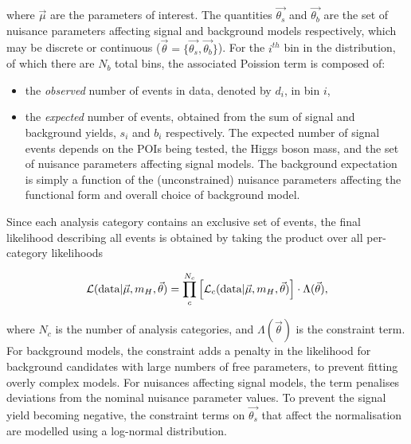 \noindent where $\vec{\mu}$ are the parameters of interest. The quantities $\vec{\theta_{s}}$ and $\vec{\theta_{b}}$ are the set of nuisance parameters affecting signal and background models respectively, which may be discrete or continuous ($\vec{\theta}=\{\vec{\theta_{s}},\vec{\theta_{b}}\}$). For the $i^{th}$ bin in the \mee distribution, of which there are $N_{b}$ total bins, the associated Poission term is composed of:

\begin{itemize}
    \item the \textit{observed} number of events in data, denoted by $d_{i}$, in bin $i$,
    \item the \textit{expected} number of events, obtained from the sum of signal and background yields, $s_{i}$ and $b_{i}$ respectively. The expected number of signal events depends on the POIs being tested, the Higgs boson mass, and the set of nuisance parameters affecting signal models. The background expectation is simply a function of the (unconstrained) nuisance parameters affecting the functional form and overall choice of background model. %
\end{itemize}



\noindent Since each analysis category contains an exclusive set of events, the final likelihood describing all events is obtained by taking the product over all per-category likelihoods

\begin{equation}
    \mathcal{L}(\mathrm{data}|\vec{\mu},m_{H},\vec{\theta}) = \prod_{c}^{N_{c}} \left[\mathcal{L}_{c}(\mathrm{data}|\vec{\mu},m_{H},\vec{\theta})\right] \cdot \Lambda({\vec{\theta}}),
\end{equation}

\noindent where $N_{c}$ is the number of analysis categories, and $\Lambda({\vec{\theta}})$ is the constraint term. For background models, the constraint adds a penalty in the likelihood for background candidates with large numbers of free parameters, to prevent fitting overly complex models. For nuisances affecting signal models, the term penalises deviations from the nominal nuisance parameter values. To prevent the signal yield becoming negative, the constraint terms on $\vec{\theta_{s}}$ that affect the normalisation are modelled using a log-normal distribution. %

